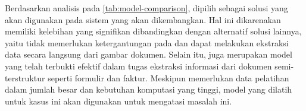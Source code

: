 \pagebreak

Berdasarkan analisis pada \autoref{tab:model-comparison}, \donut{} dipilih sebagai solusi yang akan digunakan pada sistem yang akan dikembangkan. Hal ini dikarenakan \donut{} memiliki kelebihan yang signifikan dibandingkan dengan alternatif solusi lainnya, yaitu tidak memerlukan ketergantungan pada \ocr{} dan dapat melakukan ekstraksi data secara langsung dari gambar dokumen. Selain itu, \donut{} juga merupakan model yang telah terbukti efektif dalam tugas ekstraksi informasi dari dokumen semi-terstruktur seperti formulir dan faktur. Meskipun \donut{} memerlukan data pelatihan dalam jumlah besar dan kebutuhan komputasi yang tinggi, model \donut{} yang dilatih untuk kasus ini akan digunakan untuk mengatasi masalah ini.